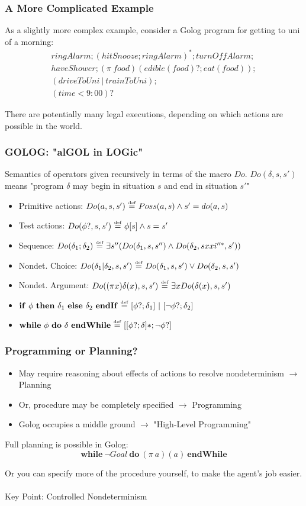 \documentclass{beamer}
\newcommand{\isdef}{\hbox{$\stackrel{\mbox{\tiny def}}{=}$}}
\begin{document}
\begin{frame}
\frametitle{A More Complicated Example}
As a slightly more complex example, consider a Golog program for
getting to uni of a morning:\[
\begin{array}{c}
ringAlarm;(hitSnooze; ringAlarm)^*;turnOffAlarm;\\
haveShower;(\pi\ food)(edible(food)?;eat(food));\\
(driveToUni\ |\ trainToUni);\\
(time<9:00)?
\end{array}\]

There are potentially many legal executions, depending on which actions
are possible in the world.
\end{frame}

\begin{frame}
\frametitle{GOLOG: "alGOL in LOGic"}
Semantics of operators given recursively in terms of the macro $Do$.
$Do(\delta,s,s')$ means "program $\delta$ may begin in situation $s$ and end
in situation $s'$"
\begin{itemize}
  \pause
  \item Primitive actions: $Do(a,s,s')\ \isdef\ Poss(a,s)\wedge s'=do(a,s)$
  \pause
  \item Test actions: $Do(\phi?,s,s')\ \isdef\ \phi [s] \wedge s=s'$
  \pause
  \item Sequence: $Do(\delta_1;\delta_2)\ \isdef\ \exists s'' (Do(\delta_1,s,s'')\wedge Do(\delta_2,sxxi''^*,s'))$
  \pause
  \item Nondet. Choice: $Do(\delta_1|\delta_2,s,s')\ \isdef\ Do(\delta_1,s,s')\vee Do(\delta_2,s,s')$
  \pause
  \item Nondet. Argument: $Do((\pi x)\delta(x),s,s')\ \isdef\ \exists x Do(\delta(x),s,s')$
  \pause
  \item $\mathbf{if}\ \phi\ \mathbf{then}\ \delta_1\ \mathbf{else}\ \delta_2\ \mathbf{endIf}\ \isdef\ [\phi?;\delta_1]\ |\ [\neg\phi?;\delta_2]$
  \pause
  \item $\mathbf{while}\ \phi\ \mathbf{do}\ \delta\ \mathbf{endWhile}\ \isdef\ [[\phi?;\delta]*;\neg\phi?]$
\end{itemize}
\end{frame}


\begin{frame}
\frametitle{Programming or Planning?}
\begin{itemize}
  \item May require reasoning about effects of actions to resolve nondeterminism
$\rightarrow$ Planning
  \item Or, procedure may be completely specified $\rightarrow$ Programming
  \item Golog occupies a middle ground $\rightarrow$ "High-Level Programming"
\end{itemize}

Full planning is possible in Golog:\[
\mathbf{while}\ \neg Goal\ \mathbf{do}\ (\pi\ a)(a)\ \mathbf{endWhile}\]

Or you can specify more of the procedure yourself, to make the agent's job
easier.\\
\ \\
Key Point: \alert{Controlled} Nondeterminism
\end{frame}
\end{document}

